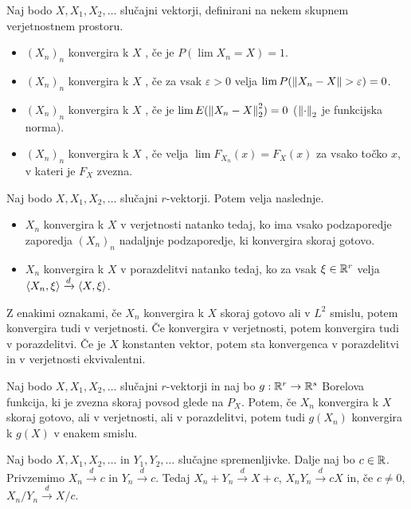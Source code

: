 
Naj bodo $X, X_1, X_2, \ldots$ slučajni vektorji, definirani na nekem skupnem
verjetnostnem prostoru.
\begin{itemize}
\item $(X_n)_n$ konvergira k $X$ , če je $P(\lim X_n = X) =
  1$.
\item $(X_n)_n$ konvergira k $X$ , če za vsak $\varepsilon
  > 0$ velja $\lim P(\left\lVert X_n - X\right\rVert > \varepsilon) = 0$.
\item $(X_n)_n$ konvergira k $X$ , če je $\lim E(\left\lVert X_n -
	X\right\rVert_2^2) = 0$ ($\left\lVert\cdot\right\rVert_2$ je funkcijska norma).
\item $(X_n)_n$ konvergira k $X$ , če velja $\lim
  F_{X_n}(x) = F_X(x)$ za vsako točko $x$, v kateri je $F_X$ zvezna.
\end{itemize}

\begin{lema}
  Naj bodo $X, X_1, X_2, \ldots$ slučajni $r$-vektorji.
  Potem velja naslednje.
  \begin{itemize}
  \item $X_n$ konvergira k $X$ v verjetnosti natanko tedaj, ko ima vsako
	podzaporedje zaporedja $(X_n)_n$ nadaljnje podzaporedje, ki konvergira
	skoraj gotovo.
  \item $X_n$ konvergira k $X$ v porazdelitvi natanko tedaj, ko za vsak $\xi \in
	\mathbb{R}^r$ velja $\left< X_n, \xi \right> \xrightarrow{d} \left< X, \xi \right>$.
  \end{itemize}
\end{lema}

\begin{trditev}
  Z enakimi oznakami, če $X_n$ konvergira k $X$ skoraj gotovo ali v $L^2$
  smislu, potem konvergira tudi v verjetnosti.
  Če konvergira v verjetnosti, potem konvergira tudi v porazdelitvi.
  Če je $X$ konstanten vektor, potem sta konvergenca v porazdelitvi in v
  verjetnosti ekvivalentni.
\end{trditev}

\begin{trditev}
  Naj bodo $X, X_1, X_2, \ldots$ slučajni $r$-vektorji in naj bo $g: \mathbb{R}^r \to
  \mathbb{R}^s$ Borelova funkcija, ki je zvezna skoraj povsod glede na $P_X$.
  Potem, če $X_n$ konvergira k $X$ skoraj gotovo, ali v verjetnosti, ali v
  porazdelitvi, potem tudi $g(X_n)$ konvergira k $g(X)$ v enakem smislu.
\end{trditev}

\begin{trditev}[Slucki]
  Naj bodo $X, X_1, X_2, \ldots$ in $Y_1, Y_2, \ldots$ slučajne spremenljivke.
  Dalje naj bo $c \in \mathbb{R}$.
  Privzemimo $X_n \xrightarrow{d} c$ in $Y_n \xrightarrow{d} c$.
  Tedaj $X_n + Y_n \xrightarrow{d} X+c$, $X_n Y_n \xrightarrow{d} cX$ in, če $c
  \ne 0$, $X_n / Y_n \xrightarrow{d} X/c$.
\end{trditev}

